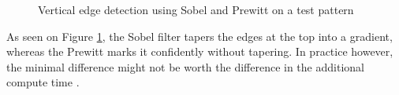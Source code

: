 \documentclass[twoside,a4paper,article]{combine}
\begin{document}
\begin{minipage}{\textwidth}\begin{figure}[H]
    \centering
    \caption{Vertical edge detection using Sobel and Prewitt on a test pattern}\label{fig:pattern}
\end{figure}\end{minipage}

As seen on Figure \ref{fig:pattern}, the Sobel filter tapers the edges at the top into a gradient, whereas the Prewitt marks it confidently without tapering. In practice however,
the minimal difference might not be worth the difference in the additional compute time \cite{NIXON2020141}.
\end{document}

